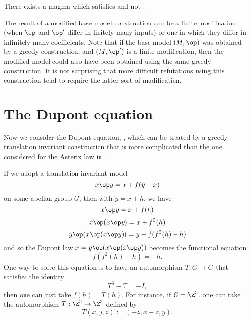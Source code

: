 \begin{theorem}\label{non_imp_1659_4315_thm}
  \leanok
  There exists a magma which satisfies  and not .
\end{theorem}

The result of a modified base model construction can be a finite modification (when $\op$ and $\op'$
differ in finitely many inputs) or one in which they differ in infinitely many coefficients. Note that if the base
model $(M,\op)$ was obtained by a greedy construction, and $(M,\op')$ is a finite modification, then the
modified model could also have been obtained using the same greedy construction. It is not surprising that
more difficult refutations using this construction tend to require the latter sort of modification.


\section{The Dupont equation}\label{dupont-section}

Now we consider the Dupont equation, , which can be treated by a greedy translation invariant construction that is more complicated than the one considered for the Asterix law in .

If we adopt a translation-invariant model
$$ x \op y = x + f(y-x)$$
on some abelian group $G$, then with $y = x+h$, we have
$$ x \op y = x + f(h)$$
$$ x \op (x \op y) = x + f^2(h)$$
$$ y \op (x \op (x \op y)) = y + f(f^2(h)-h)$$
and so the Dupont law $x = y \op (x \op (x \op y))$ becomes the functional equation
\begin{equation}\label{dupont-eq}
  f(f^2(h)-h) = -h.
\end{equation}
One way to solve this equation is to have an automorphism $T: G \to G$ that satisfies the identity
$$ T^3 - T = -I,$$
then one can just take $f(h) = T(h)$.  For instance, if $G = \Z^3$, one can take the automorphism $T: \Z^3 \to \Z^3$ defined by
$$ T(x,y,z) := (-z,x+z,y).$$

